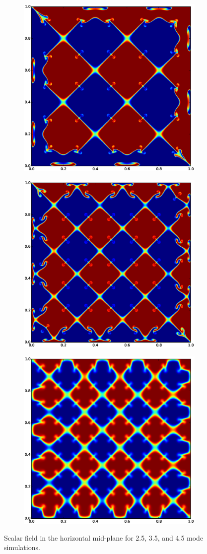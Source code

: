 \begin{figure}
\begin{subfigure}[b]{0.66\columnwidth}
  \includegraphics[width=0.66\columnwidth]{figs/scalar-25-20}
\end{subfigure}
\begin{subfigure}[b]{0.66\columnwidth}
  \includegraphics[width=0.66\columnwidth]{figs/scalar-35-20}
\end{subfigure}
\begin{subfigure}[b]{0.66\columnwidth}
  \includegraphics[width=0.66\columnwidth]{figs/scalar-45-20}
\end{subfigure}
\caption{ 
Scalar field in the horizontal mid-plane for 2.5, 3.5, and 4.5 mode simulations.
}
\end{figure}



